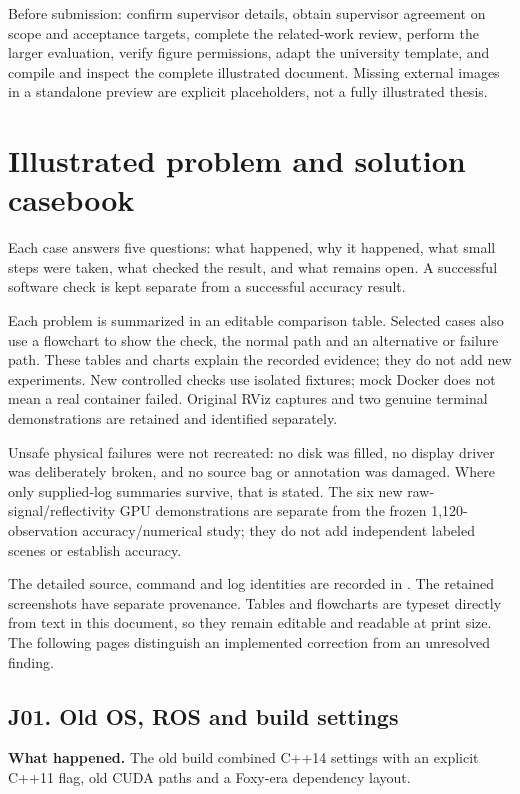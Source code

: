 \documentclass[11pt,a4paper]{article}
\newcommand{\code}[1]{\texttt{\detokenize{#1}}}
\begin{document}
Before submission: confirm supervisor details, obtain supervisor
agreement on scope and acceptance targets, complete the related-work review,
perform the larger evaluation, verify figure permissions, adapt the university
template, and compile and inspect the complete illustrated document. Missing
external images in a standalone preview are explicit placeholders, not a fully
illustrated thesis.

\clearpage
\appendix
\section{Illustrated problem and solution casebook}
\label{appendix:casebook}
Each case answers five questions: what happened, why it happened, what small steps were taken, what checked the result, and what remains open. A successful software check is kept separate from a successful accuracy result.

Each problem is summarized in an editable comparison table. Selected cases also use a flowchart to show the check, the normal path and an alternative or failure path. These tables and charts explain the recorded evidence; they do not add new experiments. New controlled checks use isolated fixtures; mock Docker does not mean a real container failed. Original RViz captures and two genuine terminal demonstrations are retained and identified separately.

Unsafe physical failures were not recreated: no disk was filled, no display driver was deliberately broken, and no source bag or annotation was damaged. Where only supplied-log summaries survive, that is stated. The six new raw-signal/reflectivity GPU demonstrations are separate from the frozen 1,120-observation accuracy/numerical study; they do not add independent labeled scenes or establish accuracy.

The detailed source, command and log identities are recorded in \code{docs/thesis_cases.json}. The retained screenshots have separate provenance. Tables and flowcharts are typeset directly from text in this document, so they remain editable and readable at print size. The following pages distinguish an implemented correction from an unresolved finding.

\clearpage
\subsection{J01. Old OS, ROS and build settings}
\label{case:J01}
\textbf{What happened.} The old build combined C++14 settings with an explicit C++11 flag, old CUDA paths and a Foxy-era dependency layout.
\end{document}
